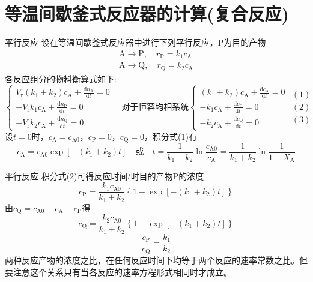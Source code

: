 \section{等温间歇釜式反应器的计算(复合反应)}


\begin{frame}{平行反应}
    设在等温间歇釜式反应器中进行下列平行反应，P为目的产物
    \vspace{-2pt}
    $$\begin{array}{l}
        \mathrm{A} \longrightarrow \mathrm{P}, \quad r_{\mathrm{P}}=k_{1} c_{\mathrm{A}} \\
        \mathrm{A} \longrightarrow \mathrm{Q}, \quad r_{\mathrm{Q}}=k_{2} c_{\mathrm{A}}
    \end{array}$$
    各反应组分的物料衡算式如下: 
    $$\begin{cases}
        V_{\mathrm{r}}(k_{1}+k_{2}) c_{\mathrm{A}}+\frac{\mathrm{d} n_{\mathrm{A}}}{\mathrm{d} t}=0\\
        -V_{\mathrm{r}} k_{1} c_{\mathrm{A}}+\frac{\mathrm{d} n_{\mathrm{P}}}{\mathrm{d} t}=0\\
        -V_{\mathrm{r}} k_{2} c_{\mathrm{A}}+\frac{\mathrm{d} n_{\mathrm{Q}}}{\mathrm{d} t}=0
    \end{cases}
    \quad \text{对于恒容均相系统}
    \begin{cases}
        (k_{1}+k_{2}) c_{\mathrm{A}}+\frac{\mathrm{d} c_{\mathrm{A}}}{\mathrm{d} t}=0\\
        -k_{1} c_{\mathrm{A}}+\frac{\mathrm{d} c_{\mathrm{P}}}{\mathrm{d} t}=0\\
        -k_{2} c_{\mathrm{A}}+\frac{\mathrm{d} c_{\mathrm{Q}}}{\mathrm{d} t}=0
    \end{cases}
    \begin{matrix}
        (1)\\
        (2)\\
        (3)
    \end{matrix}$$
    设$t=0$时，$c_\mathrm{A}=c_\mathrm{A0}$，$c_\mathrm{P}=0$，$c_\mathrm{Q}=0$，积分式(1)有
    $$c_{\mathrm{A}}=c_{\mathrm{A} 0} \exp [-(k_{1}+k_{2}) t] \quad \text{或}\quad t=\frac{1}{k_{1}+k_{2}} \ln \frac{c_{\mathrm{A} 0}}{c_{\mathrm{A}}} =\frac{1}{k_{1}+k_{2}} \ln \frac{1}{1-X_{\mathrm{A}}}$$
\end{frame}


\begin{frame}{平行反应}
    积分式(2)可得反应时间$t$时目的产物P的浓度
    $$c_{\mathrm{P}}=\frac{k_{1} c_{\mathrm{A} 0}}{k_{1}+k_{2}}\left\{1-\exp \left[-(k_{1}+k_{2}) t\right]\right\}$$
    由$c_{\mathrm{Q}}=c_{\mathrm{A} 0}-c_{\mathrm{A}}-c_{\mathrm{P}}$得
    $$c_{\mathrm{Q}}=\frac{k_{2} c_{\mathrm{A} 0}}{k_{1}+k_{2}}\left\{1-\exp \left[-(k_{1}+k_{2}) t\right]\right\}$$
    $$\frac{c_{\mathrm{P}}}{c_{\mathrm{Q}}}=\frac{k_{1}}{k_{2}}$$
    两种反应产物的浓度之比，在任何反应时间下均等于两个反应的速率常数之比。但要注意这个关系只有当各反应的速率方程形式相同时才成立。
\end{frame}


